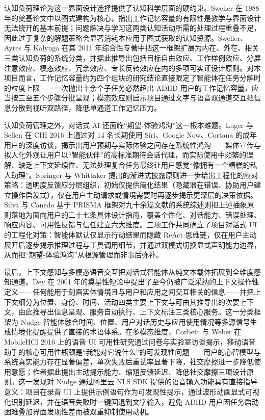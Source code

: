 \par 认知负荷理论为这一界面设计选择提供了认知科学层面的硬约束。Sweller 在 1988 年的奠基论文中以图式建构为核心，指出工作记忆容量的有限性是教学与界面设计无法绕开的基本前提；问题解决与学习这两类认知活动所需的处理过程重叠不足，因此过于复杂的解题策略会显著消耗本应用于图式获取的认知资源\cite{sweller1988cognitive}。Sweller、Ayres 与 Kalyuga 在其 2011 年综合性专著中把这一框架扩展为内在、外在、相关三类认知负荷的系统分类，并据此推导出包括目标自由效应、工作样例效应、分屏注意效应、模态效应、冗余效应、专长反转效应在内的多项可实证设计原则\cite{sweller2011cognitive}。对本项目而言，工作记忆容量约为四个组块的研究结论直接限定了智能体在任务分解时的粒度上限——一次抛出十余个子任务必然超出 ADHD 用户的工作记忆容量，应当按三至五个步骤分批呈现；模态效应则启示项目通过文字与语音双通道交互把信息分散到视听双路径，降低单通道工作记忆压力。

\par 认知负荷管理之外，对话式 AI 还面临``期望-体验鸿沟''这一根本难题。Luger 与 Sellen 在 CHI 2016 上通过对 14 名长期使用 Siri、Google Now、Cortana 的成年用户的深度访谈，揭示出用户预期与实际体验之间存在系统性鸿沟——媒体宣传与拟人化外观让用户以``智能伙伴''的高标准期待会话代理，而实际使用中频繁的误解、缺乏上下文延续性、无法处理复合任务最终让用户感觉``像拥有一个糟糕的私人助理''\cite{luger2016bad}。Springer 与 Whittaker 提出的渐进式披露原则进一步给出工程化的应对策略：透明度反馈应分层组织，初始仅提供简化结果（隐藏潜在错误、协助用户建立操作启发式），仅在用户主动请求或情境需要时再逐步揭示更深层的决策依据\cite{springer2020progressive}。Silva 与 Canedo 基于 PRISMA 框架对九十余篇文献的系统综述则把上述抽象原则落地为面向用户的二十七条具体设计指南，覆盖个性化、对话能力、错误处理、响应内容、可用性反馈与信任建立六大维度\cite{silva2022chatbot}。三项工作共同确立了项目对话式 UI 的工程化对策：智能体默认仅显示行动结果而隐藏 ReAct 思维链，仅在用户主动展开后逐步揭示推理过程与工具调用细节，并通过双模式切换显式声明能力边界，从而把``期望-体验鸿沟''从根源管理而非事后弥补。

\par 最后，上下文感知与多模态语音交互把对话式智能体从纯文本载体拓展到全维度感知通道。Dey 在 2001 年的奠基性短论中提出了至今仍被广泛采纳的上下文操作性定义——任何能用于刻画实体情境且与用户和应用之间交互相关的信息——并把上下文细分为位置、身份、时间、活动四类主要上下文与可由其推导出的次要上下文，由此推导出信息呈现、服务自动执行、上下文标注三类核心服务\cite{dey2001context}。这一分类框架为 Nudge 智能体融合时间、位置、用户对话历史与应用使用情况等多源信号生成情境化提醒提供了直接的术语体系。在多模态维度，Corbett 与 Weber 在 MobileHCI 2016 上的语音 UI 可用性研究通过问卷与实验室访谈揭示，移动语音助手的核心可用性瓶颈是``我能对它说什么''的可发现性问题——用户的心智模型与系统真实能力存在显著偏差，单次失败后重试率显著下降，社交摩擦进一步降低使用意愿；作者据此提出主动提示能力、缩短反馈延迟、降低社交摩擦三项设计原则\cite{corbett2016voice}。这一发现对 Nudge 通过阿里云 NLS SDK 提供的语音输入功能具有直接指导意义：项目在录音 UI 上提供示例语句作为可发现性提示，通过波形动画显式可视化识别延迟，并在语音失败时一键回退到文字输入，避免 ADHD 用户因任务启动困难叠加界面发现性差而被双重抑制使用动机。

